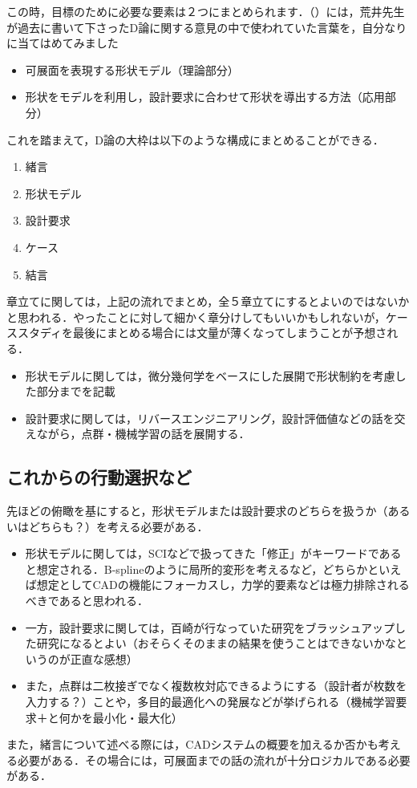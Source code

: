 \documentclass[11pt]{jsarticle}
\begin{document}
		この時，目標のために必要な要素は２つにまとめられます．（）には，荒井先生が過去に書いて下さったD論に関する意見の中で使われていた言葉を，自分なりに当てはめてみました
		\begin{itemize}
			\item 可展面を表現する形状モデル（理論部分）
			\item 形状をモデルを利用し，設計要求に合わせて形状を導出する方法（応用部分）
		\end{itemize}
		これを踏まえて，D論の大枠は以下のような構成にまとめることができる．
		\begin{enumerate}
			\item 緒言
			\item 形状モデル
			\item 設計要求
			\item ケース
			\item 結言
		\end{enumerate}
		章立てに関しては，上記の流れでまとめ，全５章立てにするとよいのではないかと思われる．やったことに対して細かく章分けしてもいいかもしれないが，ケーススタディを最後にまとめる場合には文量が薄くなってしまうことが予想される．
		
		\begin{itemize}
			\item 形状モデルに関しては，微分幾何学をベースにした展開で形状制約を考慮した部分までを記載
			\item 設計要求に関しては，リバースエンジニアリング，設計評価値などの話を交えながら，点群・機械学習の話を展開する．
		\end{itemize}
		\subsection{これからの行動選択など}
			先ほどの俯瞰を基にすると，形状モデルまたは設計要求のどちらを扱うか（あるいはどちらも？）を考える必要がある．
			
			\begin{itemize}
				\item 形状モデルに関しては，SCIなどで扱ってきた「修正」がキーワードであると想定される．B-splineのように局所的変形を考えるなど，どちらかといえば想定としてCADの機能にフォーカスし，力学的要素などは極力排除されるべきであると思われる．
				\item 一方，設計要求に関しては，百崎が行なっていた研究をブラッシュアップした研究になるとよい（おそらくそのままの結果を使うことはできないかなというのが正直な感想）
				\item また，点群は二枚接ぎでなく複数枚対応できるようにする（設計者が枚数を入力する？）ことや，多目的最適化への発展などが挙げられる（機械学習要求＋と何かを最小化・最大化）
			\end{itemize}
			また，緒言について述べる際には，CADシステムの概要を加えるか否かも考える必要がある．その場合には，可展面までの話の流れが十分ロジカルである必要がある．
			
\end{document}
